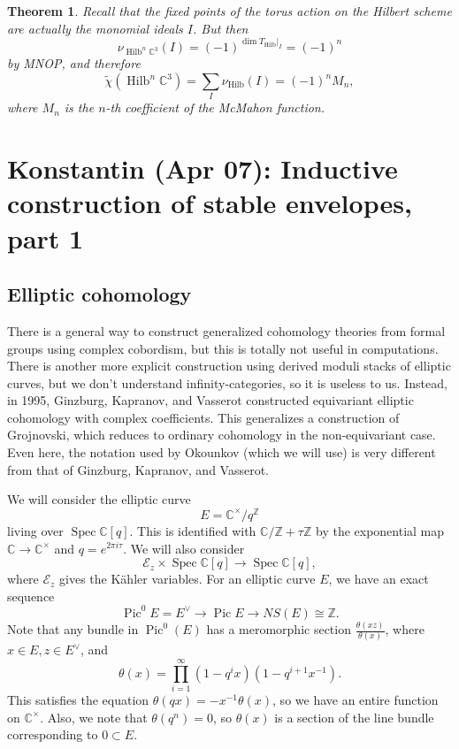 \documentclass[leqno, openany]{memoir}
\newtheorem{thm}{Theorem}[section]
\theoremstyle{definition}
\theoremstyle{remark}
\theoremstyle{plain}
\theoremstyle{definition}
\theoremstyle{remark}
\newcommand{\C}{\mathbb{C}}
\newcommand{\Z}{\mathbb{Z}}
\newcommand{\mc}[1]{\mathcal{#1}}
\newcommand{\mr}[1]{\mathrm{#1}}
\newcommand{\on}[1]{\operatorname{#1}}
\newcommand{\wt}[1]{\widetilde{#1}}
\DeclareMathOperator{\Pic}{Pic}
\DeclareMathOperator{\Spec}{Spec}
\begin{document}
\begin{thm}
    Recall that the fixed points of the torus action on the Hilbert scheme are actually the monomial ideals $I$. But then
    \[ \nu_{\on{Hilb}^n \C^3}(I) = (-1)^{\dim T_{\on{Hilb}} |_I} = (-1)^n \]
    by MNOP, and therefore
    \[ \wt{\chi}(\on{Hilb}^n \C^3) = \sum_I \nu_{\mr{Hilb}}(I) = (-1)^n M_n, \]
    where $M_n$ is the $n$-th coefficient of the McMahon function.
\end{thm}

\chapter{Konstantin (Apr 07): Inductive construction of stable envelopes, part 1}%

\section{Elliptic cohomology}

There is a general way to construct generalized cohomology theories from formal groups using complex cobordism, but this is totally not useful in computations. There is another more explicit construction using derived moduli stacks of elliptic curves, but we don't understand infinity-categories, so it is useless to us. Instead, in 1995, Ginzburg, Kapranov, and Vasserot constructed equivariant elliptic cohomology with complex coefficients. This generalizes a construction of Grojnovski, which reduces to ordinary cohomology in the non-equivariant case. Even here, the notation used by Okounkov (which we will use) is very different from that of Ginzburg, Kapranov, and Vasserot.

We will consider the elliptic curve 
\[ E = \C^{\times} / q^{\Z} \] 
living over $\Spec \C[q]$. This is identified with $\C / \Z + \tau \Z$ by the exponential map $\C \to \C^{\times}$ and $q = e^{2\pi i \tau}$. We will also consider
\[ \mc{E}_z \times \Spec \C[q] \to \Spec \C[q], \]
where $\mc{E}_z$ gives the K\"ahler variables. For an elliptic curve $E$, we have an exact sequence
\[ \Pic^0 E = E^{\vee} \to \Pic E \to NS(E) \cong \Z. \]
Note that any bundle in $\Pic^0(E)$ has a meromorphic section $\frac{\theta(xz)}{\theta(x)}$, where $x \in E, z \in E^{\vee}$, and 
\[ \theta(x) = \prod_{i=1}^{\infty} (1-q^i x) (1-q^{i+1}x^{-1}). \]
This satisfies the equation $\theta(qx) = -x^{-1} \theta(x)$, so we have an entire function on $\C^{\times}$. Also, we note that $\theta(q^n) = 0$, so $\theta(x)$ is a section of the line bundle corresponding to $\qty{0} \subset E$.
\end{document}
